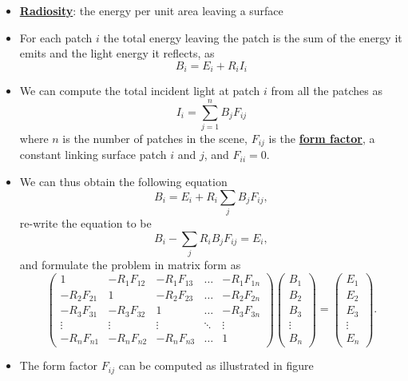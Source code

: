 \documentclass[twocolumn,landscape,10pt]{article}
\theoremstyle{definition}
\begin{document}
\begin{itemize}
    \item \underline{\textbf{Radiosity}}: the energy per unit area leaving a surface
    \item For each patch $i$ the total energy leaving the patch is the sum of
        the energy it emits and the light energy it reflects, as
        \[
            B_i=E_i+R_iI_i
        \]
    \item We can compute the total incident light at patch $i$ from all the
        patches as
        \[
            I_i=\sum_{j=1}^{n} B_jF_{ij}
        \]
        where $n$ is the number of patches in the scene, 
        $F_{ij}$ is the \underline{\textbf{form factor}},
        a constant linking surface patch $i$ and $j$, and $F_{ii}=0$.
    \item We can thus obtain the following equation
        \[
            B_i=E_i+R_i\sum_jB_jF_{ij},
        \]
        re-write the equation to be
        \[
            B_i-\sum_jR_iB_jF_{ij}=E_i,
        \]
        and formulate the problem in matrix form as
        \[
            \begin{pmatrix}
                1 & -R_1F_{12} & -R_1F_{13} & \ldots & -R_1F_{1n} \\
                -R_2F_{21} & 1 & -R_2F_{23} & \ldots & -R_2F_{2n} \\
                -R_3F_{31} & -R_3F_{32} & 1 & \ldots & -R_3F_{3n} \\
                \vdots & \vdots & \vdots & \ddots & \vdots \\
                -R_nF_{n1} & -R_nF_{n2} & -R_nF_{n3} & \ldots & 1
            \end{pmatrix} 
            \begin{pmatrix}
                B_1 \\
                B_2 \\
                B_3 \\
                \vdots \\
                B_n
            \end{pmatrix} 
            =
            \begin{pmatrix}
                E_1 \\
                E_2 \\
                E_3 \\
                \vdots \\
                E_n
            \end{pmatrix}.
        \]
    \item The form factor $F_{ij}$ can be computed as illustrated in figure

\end{itemize}
\end{document}
